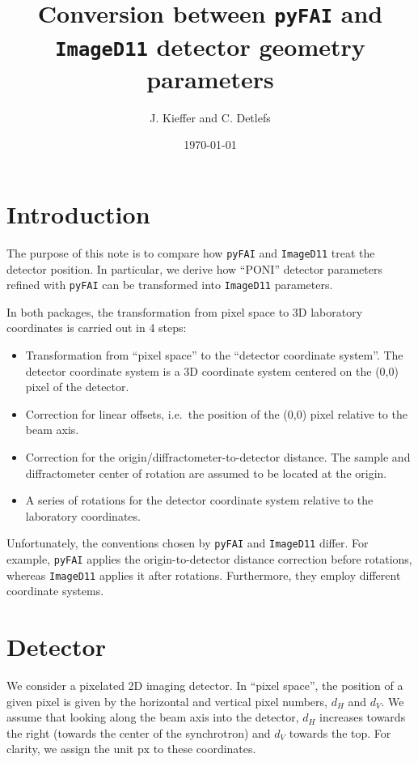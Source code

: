 \documentclass[12pt]{article}
\begin{document}
\title{Conversion between \texttt{pyFAI} and \texttt{ImageD11}
  detector geometry parameters} \author{J. Kieffer and C. Detlefs}
\date{\today} \maketitle

\section{Introduction}

The purpose of this note is to compare how \texttt{pyFAI} and
\texttt{ImageD11} treat the detector position. In particular, we
derive how ``PONI'' detector parameters refined with \texttt{pyFAI}
can be transformed into \texttt{ImageD11} parameters.

In both packages, the transformation from pixel space to 3D laboratory
coordinates is carried out in 4 steps:
\begin{itemize}
\item Transformation from ``pixel space'' to the ``detector
  coordinate system''. The detector coordinate system is a 3D
  coordinate system centered on the (0,0) pixel of the detector.
\item Correction for linear offsets, i.e.~the position of the (0,0)
  pixel relative to the beam axis.
\item Correction for the origin/diffractometer-to-detector
  distance. The sample and diffractometer center of rotation are
  assumed to be located at the origin.
\item A series of rotations for the detector coordinate system
  relative to the laboratory coordinates.
\end{itemize}

Unfortunately, the conventions chosen by \texttt{pyFAI} and
\texttt{ImageD11} differ. For example, \texttt{pyFAI} applies the
origin-to-detector distance correction before rotations, whereas
\texttt{ImageD11} applies it after rotations. Furthermore, they employ
different coordinate systems.

\section{Detector}

We consider a pixelated 2D imaging detector. In ``pixel space'', the
position of a given pixel is given by the horizontal and vertical
pixel numbers, $d_H$ and $d_V$. We assume that looking along the beam
axis into the detector, $d_H$ increases towards the right (towards the
center of the synchrotron) and $d_V$ towards the top. For clarity, we
assign the unit $\mathrm{px}$ to these coordinates.
\end{document}
